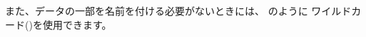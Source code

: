\documentclass[11pt,a4paper]{jarticle}
\begin{document}
また、データの一部を名前を付ける必要がないときには、
のように
ワイルドカード(\prog{_})を使用できます。




\end{document}
